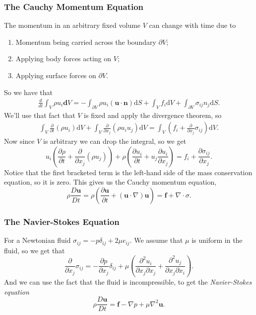 \documentclass{article}
\begin{document}
\subsubsection{The Cauchy Momentum Equation}
The momentum in an arbitrary fixed volume $ V $ can change with time due to 
\begin{enumerate}
	\item Momentum being carried across the boundary $ \partial V $;
	\item Applying body forces acting on $ V $;
	\item Applying surface forces on $ \partial V $.
\end{enumerate}
So we have that
\begin{align*}
	\frac d{dt} \int_V \rho u_i \mathbf dV = -\int_{\partial V} \rho u_i(\mathbf u \cdot\mathbf n)\mathrm dS + \int_V f_i \mathrm dV + \int_{\partial V}\sigma_{ij}n_j\mathrm dS.
\end{align*}
We'll use that fact that $ V $ is fixed and apply the divergence theorem, so
\begin{align*}
	\int_V \frac\partial{\partial t} (\rho u_i)\mathrm dV + \int_V\frac{\partial}{\partial x_j}(\rho u_iu_j)\mathrm dV =  \int_V \left(f_i+\frac{\partial}{\partial x_j}\sigma_{ij}\right)\mathrm dV.
\end{align*}
Now since $ V $ is arbitrary we can drop the integral, so we get
\[
u_i\left(\frac {\partial \rho}{\partial t} + \frac{\partial}{\partial x_j}(\rho u_j)\right) + \rho \left(\frac{\partial u_i}{\partial t} + u_j \frac{\partial u_i}{\partial x_j}\right) = f_i + \frac{\partial \sigma_{ij}}{\partial x_j}.
\]
Notice that the first bracketed term is the left-hand side of the mass conservation equation, so it is zero. This gives us the Cauchy momentum equation,
\[
	\rho \frac{D\mathbf u }{Dt} = \rho\left(\frac{\partial\mathbf u}{\partial t} + (\mathbf u \cdot\nabla)\mathbf u\right) = \mathbf f + \nabla\cdot\sigma.
\]
\subsubsection{The Navier-Stokes Equation}
For a Newtonian fluid $ \sigma_{ij} = - p\delta_{ij} + 2\mu e_{ij} $. We assume that $ \mu $ is uniform in the fluid, so we get that 
\[
	\frac \partial{\partial x_j}\sigma_{ij} = - \frac{\partial p}{\partial x_j}\delta_{ij} + \mu\left(\frac{\partial^2 u_i}{\partial x_j\partial x_j}+\frac{\partial^2 u_j}{\partial x_j\partial x_i}\right).
\]
And we can use the fact that the fluid is incompressible, to get the \textit{Navier-Stokes equation}
\[
	\rho \frac{D \mathbf u}{Dt} = \mathbf f - \nabla p + \mu\nabla^2 \mathbf u.
\]
\end{document}
